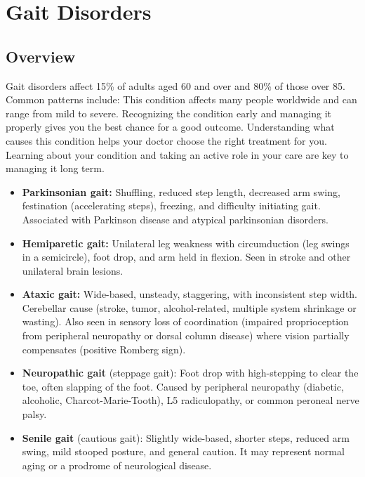 \chapter{Gait Disorders}
\label{sec:Gait Disorders}

\section{Overview}
Gait disorders affect 15\% of adults aged 60 and over and 80\% of those over 85. Common patterns include: This condition affects many people worldwide and can range from mild to severe. Recognizing the condition early and managing it properly gives you the best chance for a good outcome. Understanding what causes this condition helps your doctor choose the right treatment for you. Learning about your condition and taking an active role in your care are key to managing it long term.

\begin{itemize}[noitemsep]
  \item \textbf{Parkinsonian gait:} Shuffling, reduced step length, decreased arm swing, festination (accelerating steps), freezing, and difficulty initiating gait. Associated with Parkinson disease and atypical parkinsonian disorders.
  \item \textbf{Hemiparetic gait:} Unilateral leg weakness with circumduction (leg swings in a semicircle), foot drop, and arm held in flexion. Seen in stroke and other unilateral brain lesions.
  \item \textbf{Ataxic gait:} Wide-based, unsteady, staggering, with inconsistent step width. Cerebellar cause (stroke, tumor, alcohol-related, multiple system shrinkage or wasting). Also seen in sensory loss of coordination (impaired proprioception from peripheral neuropathy or dorsal column disease) where vision partially compensates (positive Romberg sign).
  \item \textbf{Neuropathic gait} (steppage gait): Foot drop with high-stepping to clear the toe, often slapping of the foot. Caused by peripheral neuropathy (diabetic, alcoholic, Charcot-Marie-Tooth), L5 radiculopathy, or common peroneal nerve palsy.
  \item \textbf{Senile gait} (cautious gait): Slightly wide-based, shorter steps, reduced arm swing, mild stooped posture, and general caution. It may represent normal aging or a prodrome of neurological disease.
\end{itemize}

